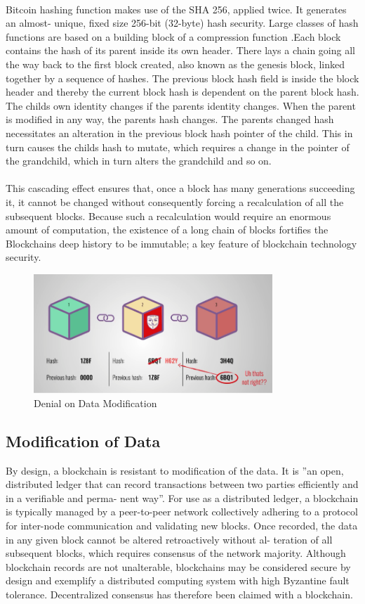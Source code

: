 \paragraph{}Bitcoin hashing function makes use of the SHA 256, applied twice. It generates an almost-
unique, fixed size 256-bit (32-byte) hash security. Large classes of hash functions are based on
a building block of a compression function .Each block contains the hash of its parent inside its
own header. There lays a chain going all the way back to the first block created, also known as
the genesis block, linked together by a sequence of hashes. The previous block hash field is inside
the block header and thereby the current block hash is dependent on the parent block hash.
The childs own identity changes if the parents identity changes. When the parent is modified in
any way, the parents hash changes. The parents changed hash necessitates an alteration in the
previous block hash pointer of the child. This in turn causes the childs hash to mutate, which
requires a change in the pointer of the grandchild, which in turn alters the grandchild and so on.
\paragraph{}This cascading effect ensures that, once a block has many generations succeeding it, it cannot
be changed without consequently forcing a recalculation of all the subsequent blocks. Because
such a recalculation would require an enormous amount of computation, the existence of a long
chain of blocks fortifies the Blockchains deep history to be immutable; a key feature of blockchain
technology security.
\begin{figure}[h]
	\centering
	\includegraphics[width=9cm]{./block_change_hash}
	\caption{Denial on Data Modification}
\end{figure}
\subsection{Modification of Data}
By design, a blockchain is resistant to modification of the data. It is ”an open, distributed
ledger that can record transactions between two parties efficiently and in a verifiable and perma-
nent way”. For use as a distributed ledger, a blockchain is typically managed by a peer-to-peer
network collectively adhering to a protocol for inter-node communication and validating new
blocks. Once recorded, the data in any given block cannot be altered retroactively without al-
teration of all subsequent blocks, which requires consensus of the network majority. Although
blockchain records are not unalterable, blockchains may be considered secure by design and
exemplify a distributed computing system with high Byzantine fault tolerance. Decentralized
consensus has therefore been claimed with a blockchain.
